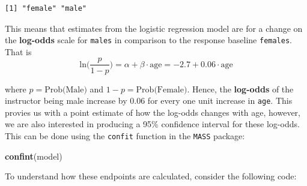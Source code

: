 \documentclass[]{article}
\newenvironment{Shaded}{\begin{snugshade}}{\end{snugshade}}
\newcommand{\KeywordTok}[1]{\textcolor[rgb]{0.13,0.29,0.53}{\textbf{#1}}}
\newcommand{\DataTypeTok}[1]{\textcolor[rgb]{0.13,0.29,0.53}{#1}}
\newcommand{\StringTok}[1]{\textcolor[rgb]{0.31,0.60,0.02}{#1}}
\newcommand{\OtherTok}[1]{\textcolor[rgb]{0.56,0.35,0.01}{#1}}
\newcommand{\OperatorTok}[1]{\textcolor[rgb]{0.81,0.36,0.00}{\textbf{#1}}}
\newcommand{\NormalTok}[1]{#1}
\begin{document}
\begin{Shaded}
\end{Shaded}

\begin{verbatim}
[1] "female" "male"  
\end{verbatim}

This means that estimates from the logistic regression model are for a
change on the \textbf{log-odds} scale for \texttt{males} in comparison
to the response baseline \texttt{females}. That is
\[\mbox{ln} \bigg( \frac{p}{1-p} \bigg) = \alpha + \beta \cdot \mbox{age} = -2.7 + 0.06 \cdot \mbox{age}\]

where \(p = \mbox{Prob(Male)}\) and \(1-p = \mbox{Prob(Female)}\).
Hence, the \textbf{log-odds} of the instructor being male increase by
0.06 for every one unit increase in \texttt{age}. This provies us with a
point estimate of how the log-odds changes with age, however, we are
also interested in producing a 95\% confidence interval for these
log-odds. This can be done using the \texttt{confit} function in the
\texttt{MASS} package:

\begin{Shaded}
\end{Shaded}

\begin{Shaded}
\begin{Highlighting}[]
\KeywordTok{confint}\NormalTok{(model)}
\end{Highlighting}
\end{Shaded}

To understand how these endpoints are calculated, consider the following
code:

\begin{Shaded}
\end{Shaded}
\end{document}
